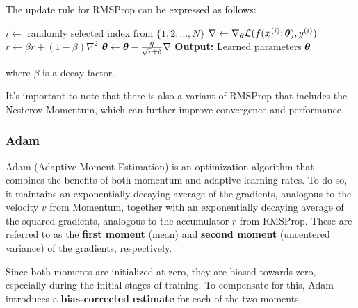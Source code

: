 The update rule for RMSProp can be expressed as follows:
\begin{algorithm}[H]
    \caption{RMSProp}
    \begin{algorithmic}[1]
            \State $i \leftarrow$ randomly selected index from $\{1, 2, \ldots, N\}$
            \State $\nabla \leftarrow \nabla_{\boldsymbol{\theta}} \mathcal{L}(f(\boldsymbol{x}^{(i)}; \boldsymbol{\theta}), y^{(i)})$
            \State $r \leftarrow \beta r + (1 - \beta) \nabla^2$
            \State $\boldsymbol{\theta} \leftarrow \boldsymbol{\theta} - \frac{\eta}{\sqrt{r} + \delta} \nabla$
        \EndWhile
        \State \textbf{Output:} Learned parameters $\boldsymbol{\theta}$
    \end{algorithmic}
\end{algorithm}
where $\beta$ is a decay factor.

It's important to note that there is also a variant of RMSProp that includes the Nesterov Momentum, which can further improve convergence and performance.

\subsubsection{Adam}
Adam (Adaptive Moment Estimation) is an optimization algorithm that combines the benefits of both momentum and adaptive learning rates.
To do so, it maintains an exponentially decaying average of the gradients, analogous to the velocity $v$ from Momentum, together with an exponentially decaying average of the squared gradients, analogous to the accumulator $r$ from RMSProp. These are referred to as the \textbf{first moment} (mean) and \textbf{second moment} (uncentered variance) of the gradients, respectively.

Since both moments are initialized at zero, they are biased towards zero, especially during the initial stages of training. To compensate for this, Adam introduces a \textbf{bias-corrected estimate} for each of the two moments.


